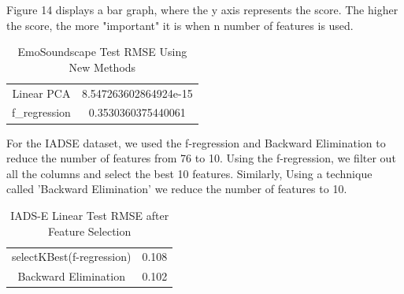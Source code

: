 \documentclass[conference]{IEEEtran}
\begin{document}
\FloatBarrier

\noindent
Figure 14 displays a bar graph, where the y axis represents the score. The higher the score, the more "important" it is when n number of features is used. \\

\begin{table}[h]
\caption{EmoSoundscape Test RMSE Using New Methods}
\begin{center}
\begin{tabular}{ |c|c| } 
 \hline
 Linear PCA & 8.547263602864924e-15 \\
 f\_regression & 0.3530360375440061 \\
 \hline
\end{tabular}

\end{center}
\label{tab:myTab}
\end{table}
\FloatBarrier

\noindent
For the IADSE dataset, we used the f-regression and Backward Elimination to reduce the number of features from 76 to 10. Using the f-regression, we filter out all the columns and select the best 10 features. Similarly, Using a technique called 'Backward Elimination' we reduce the number of features to 10. \\

\begin{table}[h]
\caption{IADS-E Linear Test RMSE after Feature Selection}
\begin{center}
\begin{tabular}{ |c|c| } 
 \hline
 selectKBest(f-regression) & 0.108 \\
 Backward Elimination & 0.102 \\
 \hline
\end{tabular}

\end{center}
\label{tab:myTab}
\end{table}
\end{document}
